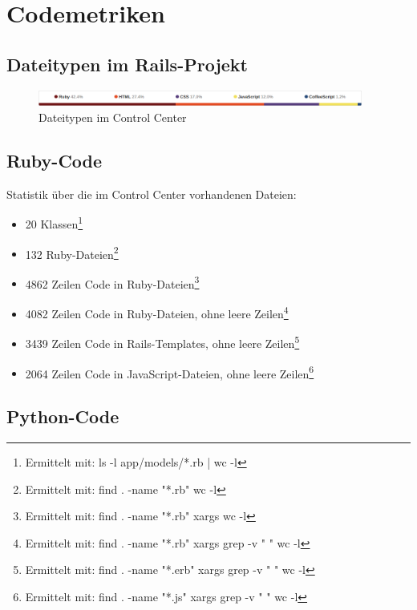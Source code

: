 \chapter{Codemetriken} \label{appendix:code-metrics}

\section*{Dateitypen im Rails-Projekt}

\begin{figure}
  \centering
    \includegraphics[width=0.95\textwidth]{fig/github_filetypes}
  \caption{Dateitypen im Control Center}
  \label{fig:metrics-filetypes}
\end{figure}

\section*{Ruby-Code}

Statistik über die im Control Center vorhandenen Dateien:

\begin{itemize}
\item 20 Klassen\footnote{Ermittelt mit: ls -l app/models/*.rb | wc -l}
\item 132 Ruby-Dateien\footnote{Ermittelt mit: find . -name "*.rb" \textbar wc -l}
\item 4862 Zeilen Code in Ruby-Dateien\footnote{Ermittelt mit: find . -name "*.rb" \textbar xargs wc -l}
\item 4082 Zeilen Code in Ruby-Dateien, ohne leere Zeilen\footnote{Ermittelt mit: find . -name "*.rb" \textbar xargs grep -v "  " \textbar wc -l}
\item 3439 Zeilen Code in Rails-Templates, ohne leere Zeilen\footnote{Ermittelt mit: find . -name "*.erb" \textbar xargs grep -v "  " \textbar wc -l}
\item 2064 Zeilen Code in JavaScript-Dateien, ohne leere Zeilen\footnote{Ermittelt mit: find . -name "*.js" \textbar xargs grep -v "  " \textbar wc -l}
\end{itemize}

\section*{Python-Code}

